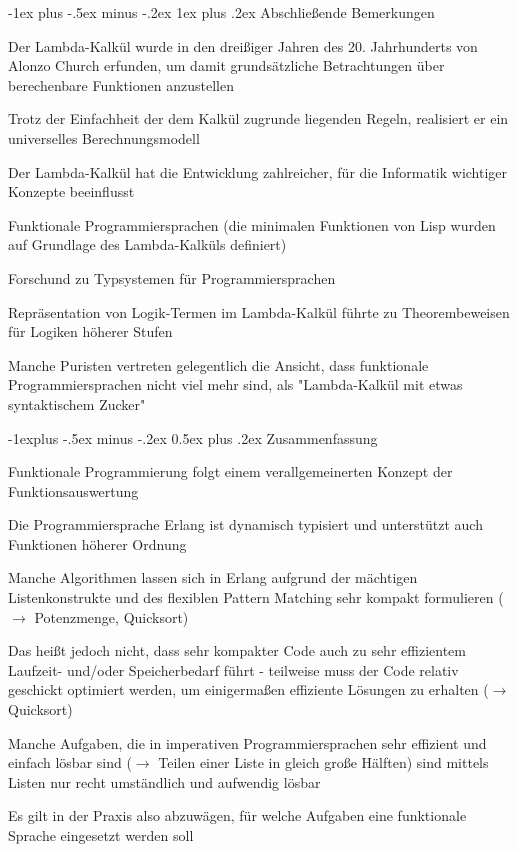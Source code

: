 \documentclass[10pt]{article}
\makeatletter
\renewcommand{\subsection}{\@startsection{subsection}{2}{0mm}%
                                {-1explus -.5ex minus -.2ex}%
                                {0.5ex plus .2ex}%
                                {\normalfont\normalsize\bfseries}}
\renewcommand{\subsubsection}{\@startsection{subsubsection}{3}{0mm}%
                                {-1ex plus -.5ex minus -.2ex}%
                                {1ex plus .2ex}%
                                {\normalfont\small\bfseries}}
\makeatother
\begin{document}
\subsubsection{Abschließende Bemerkungen}
\begin{itemize*}
  \item Der Lambda-Kalkül wurde in den dreißiger Jahren des 20. Jahrhunderts von Alonzo Church erfunden, um damit grundsätzliche Betrachtungen über berechenbare Funktionen anzustellen
  \item Trotz der Einfachheit der dem Kalkül zugrunde liegenden Regeln, realisiert er ein universelles Berechnungsmodell
  \item Der Lambda-Kalkül hat die Entwicklung zahlreicher, für die Informatik wichtiger Konzepte beeinflusst
  \begin{itemize*}
    \item Funktionale Programmiersprachen (die minimalen Funktionen von Lisp wurden auf Grundlage des Lambda-Kalküls definiert)
    \item Forschund zu Typsystemen für Programmiersprachen
    \item Repräsentation von Logik-Termen im Lambda-Kalkül führte zu Theorembeweisen für Logiken höherer Stufen
  \end{itemize*}
  \item Manche Puristen vertreten gelegentlich die Ansicht, dass funktionale Programmiersprachen nicht viel mehr sind, als "Lambda-Kalkül mit etwas syntaktischem Zucker"
\end{itemize*}

\subsection{Zusammenfassung}
\begin{itemize*}
  \item Funktionale Programmierung folgt einem verallgemeinerten Konzept der Funktionsauswertung
  \item Die Programmiersprache Erlang ist dynamisch typisiert und unterstützt auch Funktionen höherer Ordnung
  \item Manche Algorithmen lassen sich in Erlang aufgrund der mächtigen Listenkonstrukte und des flexiblen Pattern Matching sehr kompakt formulieren ($\rightarrow$ Potenzmenge, Quicksort)
  \item Das heißt jedoch nicht, dass sehr kompakter Code auch zu sehr effizientem Laufzeit- und/oder Speicherbedarf führt - teilweise muss der Code relativ geschickt optimiert werden, um einigermaßen effiziente Lösungen zu erhalten ($\rightarrow$ Quicksort)
  \item Manche Aufgaben, die in imperativen Programmiersprachen sehr effizient und einfach lösbar sind ($\rightarrow$ Teilen einer Liste in gleich große Hälften) sind mittels Listen nur recht umständlich und aufwendig lösbar
  \item Es gilt in der Praxis also abzuwägen, für welche Aufgaben eine funktionale Sprache eingesetzt werden soll
\end{itemize*}
\end{document}
